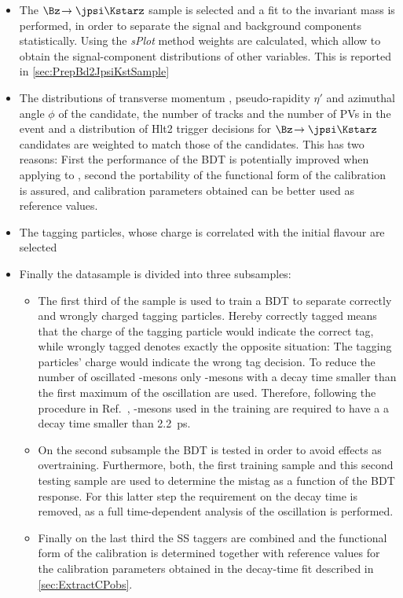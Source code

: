 \begin{itemize}
	\item The $\Bz\!\to\jpsi\Kstarz$ sample is selected and a fit to the invariant mass is performed, in order to separate the signal and background components statistically.
	Using the \emph{sPlot} method weights are calculated, which allow to obtain the signal-component distributions of other variables. This is reported in \cref{sec:PrepBd2JpsiKstSample}
	\item The distributions of transverse momentum \pt, pseudo-rapidity $\eta'$ and azimuthal angle $\phi$ of the \Bz candidate, the number of tracks and the number of \ac{PV}s in the event and a distribution of Hlt2 trigger decisions for $\Bz\!\to\jpsi\Kstarz$ candidates are weighted to match those of the \BdToDpi candidates.
	This has two reasons: First the performance of the BDT is potentially improved when applying to \BdToDpi, second the portability of the functional form of the calibration is assured, and calibration parameters obtained can be better used as reference values.
	\item The tagging particles, whose charge is correlated with the initial \B flavour are selected
	\item Finally the datasample is divided into three subsamples:
	\begin{itemize}
		\item The first third of the sample is used to train a BDT to separate correctly and wrongly charged tagging particles.
		Hereby correctly tagged means that the charge of the tagging particle would indicate the correct tag, while wrongly tagged denotes exactly the opposite situation: The tagging particles' charge would indicate the wrong tag decision.
		To reduce the number of oscillated \Bz-mesons only \Bz-mesons with a decay time smaller than the first maximum of the oscillation are used.
		Therefore, following the procedure in Ref.~\cite{Aaij:2016rdg}, \Bz-mesons used in the training are required to have a a decay time smaller than \SI{2.2}{\pico\second}.
		\item On the second subsample the BDT is tested in order to avoid effects as overtraining.
		Furthermore, both, the first training sample and this second testing sample are used to determine the mistag as a function of the BDT response. For this latter step the requirement on the \Bz decay time is removed, as a full time-dependent analysis of the \Bz oscillation is performed.
		\item Finally on the last third the SS taggers are combined and the functional form of the calibration is determined together with reference values for the calibration parameters obtained in the decay-time fit described in \cref{sec:ExtractCPobs}.
	\end{itemize}
\end{itemize}

